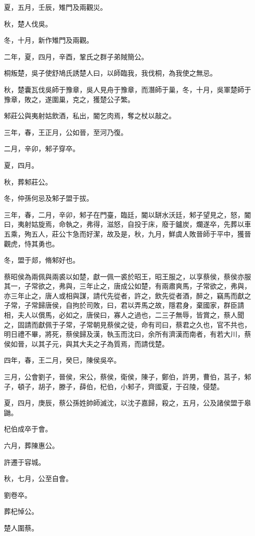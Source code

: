 \begin{pinyinscope}
夏，五月，壬辰，雉門及兩觀災。

秋，楚人伐吳。

冬，十月，新作雉門及兩觀。

二年，夏，四月，辛酉，鞏氏之群子弟賊簡公。

桐叛楚，吳子使舒鳩氏誘楚人曰，以師臨我，我伐桐，為我使之無忌。

秋，楚囊瓦伐吳師于豫章，吳人見舟于豫章，而潛師于巢，冬，十月，吳軍楚師于豫章，敗之，遂圍巢，克之，獲楚公子繁。

邾莊公與夷射姑飲酒，私出，閽乞肉焉，奪之杖以敲之。

三年，春，王正月，公如晉，至河乃復。

二月，辛卯，邾子穿卒。

夏，四月。

秋，葬邾莊公。

冬，仲孫何忌及邾子盟于拔。

三年，春，二月，辛卯，邾子在門臺，臨廷，閽以缾水沃廷，邾子望見之，怒，閽曰，夷射姑旋焉，命執之，弗得，滋怒，自投于床，廢于鑪炭，爛遂卒，先葬以車五乘，殉五人，莊公卞急而好潔，故及是，秋，九月，鮮虞人敗晉師于平中，獲晉觀虎，恃其勇也。

冬，盟于郯，脩邾好也。

蔡昭侯為兩佩與兩裘以如楚，獻一佩一裘於昭王，昭王服之，以享蔡侯，蔡侯亦服其一，子常欲之，弗與，三年止之，唐成公如楚，有兩肅爽馬，子常欲之，弗與，亦三年止之，唐人或相與謀，請代先從者，許之，飲先從者酒，醉之，竊馬而獻之子常，子常歸唐侯，自拘於司敗，曰，君以弄馬之故，隱君身，棄國家，群臣請相，夫人以償馬，必如之，唐侯曰，寡人之過也，二三子無辱，皆賞之，蔡人聞之，固請而獻佩于子常，子常朝見蔡侯之徒，命有司曰，蔡君之久也，官不共也，明日禮不畢，將死，蔡侯歸及漢，執玉而沈曰，余所有濟漢而南者，有若大川，蔡侯如晉，以其子元，與其大夫之子為質焉，而請伐楚。

四年，春，王二月，癸巳，陳侯吳卒。

三月，公會劉子，晉侯，宋公，蔡侯，衛侯，陳子，鄭伯，許男，曹伯，莒子，邾子，頓子，胡子，滕子，薛伯，杞伯，小邾子，齊國夏，于召陵，侵楚。

夏，四月，庚辰，蔡公孫姓帥師滅沈，以沈子嘉歸，殺之，五月，公及諸侯盟于皋鼬。

杞伯成卒于會。

六月，葬陳惠公。

許遷于容城。

秋，七月，公至自會。

劉卷卒。

葬杞悼公。

楚人圍蔡。


\end{pinyinscope}
